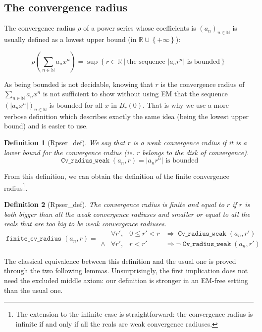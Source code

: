 \documentclass[submission,copyright]{eptcs}
\newcommand{\N}{\mathbb{N}}
\newcommand{\R}{\mathbb{R}}
\DeclareMathOperator{\cvrw}{\mathtt{Cv\_radius\_weak}}
\DeclareMathOperator{\fcvr}{\mathtt{finite\_cv\_radius}}
\newtheorem{definition}{Definition}
\begin{document}
\subsection{The convergence radius}

The convergence radius $\rho$ of a power series whose coefficients is
$(a_n)_{n \in \N}$ is usually defined as a lowest upper bound (in
$\R \cup \left\lbrace +\infty \right\rbrace$):

 $$\rho(\sum_{n \in \N} a_n x^n) = \sup \left\lbrace r \in \R ~|~
   \text{the sequence } \left|a_n r^n\right| \text{ is bounded}
   \right\rbrace$$

As being bounded is not decidable, knowing that $r$ is the convergence
radius of $\sum_{n \in \N} a_n x^n$ is not sufficient to show without
using EM that the sequence $(\left| a_n x^n \right|)_{n \in \N}$ is
bounded for all $x$ in $B_r(0)$. That is why we use a more verbose
definition which describes exactly the same idea (being the lowest upper
bound) and is easier to use.

\begin{definition}[Rpser\_def] We say that $r$ is a weak convergence
radius if it is a lower bound for the convergence radius (ie. $r$ belongs
to the disk of convergence).
$$\cvrw{}(a_n,r) = \left| a_n r^n \right| \text{ is bounded}$$
\end{definition}

From this definition, we can obtain the definition of the finite
convergence radius\footnote{The extension to the infinite case is
straightforward: the convergence radius is infinite if and only if
all the reals are weak convergence radiuses.}.

\begin{definition}[Rpser\_def] The convergence radius is finite and
equal to $r$ if $r$ is both bigger than all the weak convergence radiuses 
and smaller or equal to all the reals that are too big to be weak
convergence radiuses.
$$\fcvr{}(a_n,r) =
\begin{array}{clcl}
        & \forall r', & 0 \le r' < r & \Rightarrow \cvrw{}(a_n,r') \\
 \wedge & \forall r', & r < r' & \Rightarrow \neg \cvrw{}(a_n,r')
\end{array}$$
\end{definition}

The classical equivalence between this definition and the usual one is proved
through the two following lemmas. Unsurprisingly, the first implication does
not need the excluded middle axiom: our definition is stronger in an EM-free
setting than the usual one.
\end{document}
